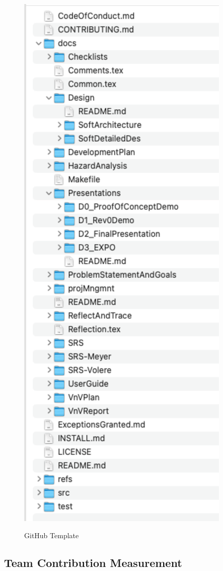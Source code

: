 \documentclass[10pt, conference]{IEEEtran}
\begin{document}
\begin{figure}[h!]
  \begin{center}
    {
      \includegraphics[width=0.7\columnwidth]{./figures/GitHubTemplate}
    }
    \caption{\label{Fig_GitHubTemplate} GitHub Template}
  \end{center}
\end{figure}

\subsection{Team Contribution Measurement}
\end{document}
